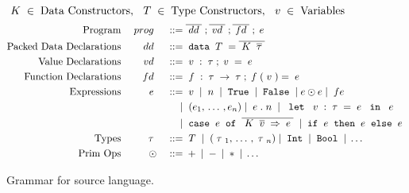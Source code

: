 \begin{figure}
    \begin{displaymath}
    \; {K} \; \in \; \textup{Data Constructors}, \:\: \; {T} \; \in \; \textup{Type Constructors}, \:\: \; v \; \in \; \textup{Variables}
  \end{displaymath} 
  \begin{displaymath}
    \begin{aligned}
      \textup{Program} && \PROG && \gramdef &
        \overline{\DD} \;; \overline{\VD} \; ; \overline{\FD} \; ; \EXPR 
        \\
      \textup{Packed Data Declarations} && \DD && \gramdef & \DATA \TC = \overline{\DC \; \overline{\sTYP}\;} \\
      \textup{Value Declarations}    && \VD && \gramdef & \var : \TYP  ; \var = \EXPR \\ 
      \textup{Function Declarations} && \FD && \gramdef &
         \fvar : \TYP \ARROW \TYP; 
         \fvar({\var}) = \EXPR \\ 
      \textup{Expressions} && \EXPR && \gramdef & \var \gramor \num \gramor \gramwd{True} \gramor \gramwd{False}
      \gramor \sEXPR \PRIM \sEXPR
      \gramor 
       \app{f}{\sEXPR} \\
%
      && && \gramor & 
      \;(e_1,\, \dots\, , e_n) \gramor \EXPR.\num 
      \gramor \letexpr{\var:\TYP}{\EXPR}{\EXPR} \\
      && && \gramor & \case{\sEXPR}{\overline{\bind{\DC \; \overline{\svar} \;}{\EXPR}}} 
            \gramor  \ife{\EXPR}{\EXPR}{\EXPR} \\
      \textup{Types} && \TYP && \gramdef &
         \TC \gramor
         \;(\TYP_1,\, \dots\, , \TYP_n)
         \gramor \gramwd{Int} \gramor \gramwd{Bool} \gramor \dots
      \\
      \textup{Prim Ops} && \PRIM && \gramdef & + \gramor - \gramor * \gramor \ldots \\
    \end{aligned}
  \end{displaymath}
   \vspace{-4mm}
  \caption{Grammar for source language.}
  \label{fig:source}
\end{figure}

